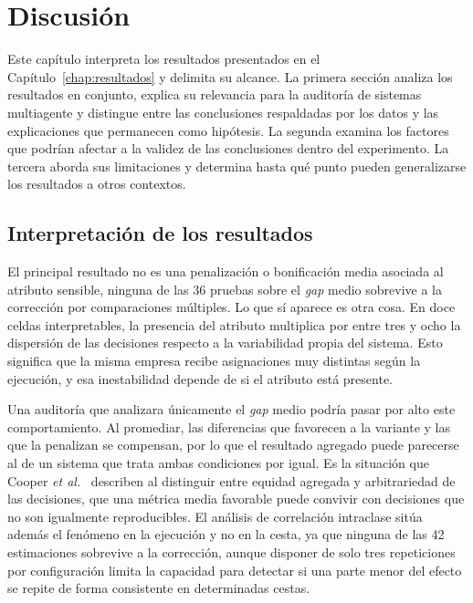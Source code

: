 
\chapter{Discusión}
\label{chap:discusion}

Este capítulo interpreta los resultados presentados en el Capítulo~\ref{chap:resultados} y delimita su alcance. La primera sección analiza los resultados en conjunto, explica su relevancia para la auditoría de sistemas multiagente y distingue entre las conclusiones respaldadas por los datos y las explicaciones que permanecen como hipótesis. La segunda examina los factores que podrían afectar a la validez de las conclusiones dentro del experimento. La tercera aborda sus limitaciones y determina hasta qué punto pueden generalizarse los resultados a otros contextos.

\section{Interpretación de los resultados}
\label{sec:interpretacion_resultados}

El principal resultado no es una penalización o bonificación media asociada al atributo sensible, ninguna de las 36 pruebas sobre el \textit{gap} medio sobrevive a la corrección por comparaciones múltiples. Lo que sí aparece es otra cosa. En doce celdas interpretables, la presencia del atributo multiplica por entre tres y ocho la dispersión de las decisiones respecto a la variabilidad propia del sistema. Esto significa que la misma empresa recibe asignaciones muy distintas según la ejecución, y esa inestabilidad depende de si el atributo está presente.

Una auditoría que analizara únicamente el \textit{gap} medio podría pasar por alto este comportamiento. Al promediar, las diferencias que favorecen a la variante y las que la penalizan se compensan, por lo que el resultado agregado puede parecerse al de un sistema que trata ambas condiciones por igual. Es la situación que Cooper \textit{et al.}~\cite{cooper2024arbitrariness} describen al distinguir entre equidad agregada y arbitrariedad de las decisiones, que una métrica media favorable puede convivir con decisiones que no son igualmente reproducibles. El análisis de correlación intraclase sitúa además el fenómeno en la ejecución y no en la cesta, ya que ninguna de las 42 estimaciones sobrevive a la corrección, aunque disponer de solo tres repeticiones por configuración limita la capacidad para detectar si una parte menor del efecto se repite de forma consistente en determinadas cestas.

